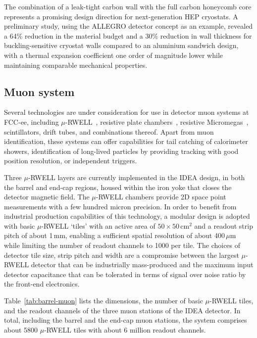 The combination of a leak-tight carbon wall with the full carbon honeycomb core 
represents a promising design direction for next-generation HEP cryostats. 
A preliminary study, using the ALLEGRO detector concept as an example, revealed 
a 64\% reduction in the material budget and a 30\% reduction in wall thickness for buckling-sensitive cryostat walls 
compared to an aluminium sandwich design, 
with a thermal expansion coefficient one order of magnitude lower while maintaining comparable mechanical properties.

\subsection{Muon system}

Several technologies are under consideration for use in detector muon systems at FCC-ee, 
including $\mu$-RWELL~\cite{MUON:micro-RWELL}, resistive plate chambers~\cite{SANTONICO1981377}, 
resistive Micromegas~\cite{ALEXOPOULOS2011110}, scintillators, drift tubes, and combinations thereof. 
Apart from muon identification, these systems can offer capabilities for tail catching of calorimeter showers, 
identification of long-lived particles by providing tracking with good position resolution, or independent triggers.

Three $\mu$-RWELL layers are currently implemented in the IDEA design, in both the barrel and end-cap regions, 
housed within the iron yoke that closes the detector magnetic field. 
The $\mu$-RWELL chambers provide 2D space point measurements with a few hundred micron precision. 
In order to benefit from industrial production capabilities of this technology, 
a modular design is adopted with basic $\mu$-RWELL `tiles' with an active area of $50 \times 50$\,cm$^2$
and a readout strip pitch of about 1\,mm, 
enabling a sufficient spatial resolution of about 400\,$\mu$m while limiting the number of readout channels to 1000 per tile.
The choices of detector tile size, strip pitch and width are a compromise between 
the largest $\mu$-RWELL detector that can be industrially mass-produced 
and the maximum input detector capacitance that can be tolerated in terms of signal over noise ratio by the front-end electronics.

Table~\ref{tab:barrel-muon} lists the dimensions, the number of basic $\mu$-RWELL tiles, 
and the readout channels of the three muon stations of the IDEA detector. 
In total, including the barrel and the end-cap muon stations, 
the system comprises about 5800 $\mu$-RWELL tiles with about 6 million readout channels. 

